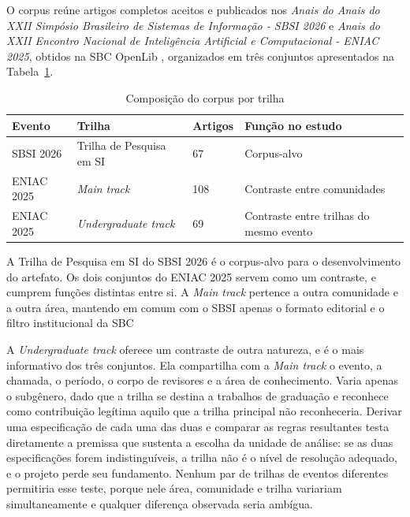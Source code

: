 O corpus reúne artigos completos aceitos e publicados nos \textit{Anais do Anais do XXII Simpósio Brasileiro de Sistemas de Informação - SBSI 2026} e \textit{Anais do XXII Encontro Nacional de Inteligência Artificial e
Computacional - ENIAC 2025}, obtidos na SBC OpenLib \cite{solsbc}, organizados em três conjuntos apresentados na Tabela~\ref{tab:corpus}.

\begin{table}[H]
\centering
\caption{Composição do corpus por trilha}
\label{tab:corpus}
\small
\begin{tabular}{|p{4.4cm}|p{3.4cm}|p{1.6cm}|p{4.0cm}|}
\hline
\textbf{Evento} & \textbf{Trilha} & \textbf{Artigos} & \textbf{Função no estudo} \\
\hline
SBSI 2026 & Trilha de Pesquisa em SI & 67 & Corpus-alvo \\
\hline
ENIAC 2025 & \textit{Main track} & 108 & Contraste entre comunidades \\
\hline
ENIAC 2025 & \textit{Undergraduate track} & 69 & Contraste entre trilhas do mesmo evento \\
\hline
\end{tabular}
\end{table}

A Trilha de Pesquisa em SI do SBSI 2026 é o corpus-alvo para o desenvolvimento do artefato. Os dois conjuntos do ENIAC 2025 servem como um contraste, e cumprem funções distintas entre si. A \textit{Main track} pertence a outra comunidade e a outra área, mantendo em comum com o SBSI apenas o formato editorial e o filtro institucional da SBC


A \textit{Undergraduate track} oferece um contraste de outra natureza, e é o mais informativo dos três conjuntos. Ela compartilha com a \textit{Main track} o evento, a chamada, o período, o corpo de revisores e a área de conhecimento. Varia apenas o subgênero, dado que a trilha se destina a trabalhos de graduação e reconhece como contribuição legítima aquilo que a trilha principal não reconheceria. Derivar uma especificação de cada uma das duas e comparar as regras resultantes testa diretamente a premissa que sustenta a escolha da unidade de análise: se as duas especificações forem indistinguíveis, a trilha não é o nível de resolução adequado, e o projeto perde seu fundamento. Nenhum par de trilhas de eventos diferentes permitiria esse teste, porque nele área, comunidade e trilha variariam simultaneamente e qualquer diferença observada seria ambígua.

